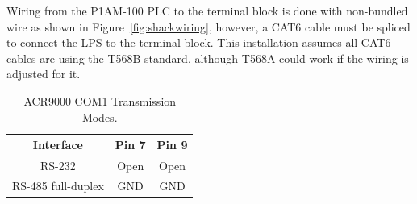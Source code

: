 \documentclass[titlepage]{article}
\begin{document}
Wiring from the P1AM-100 PLC to the terminal block is done with non-bundled wire as shown in Figure~\ref{fig:shackwiring}, however, a CAT6 cable must be spliced to connect the LPS to the terminal block. This installation assumes all CAT6 cables are using the T568B standard, although T568A could work if the wiring is adjusted for it.

\begin{table}
  \begin{center}
    \begin{tabular}{c|c|c}
      Interface          & Pin 7 & Pin 9 \\ \hline
      RS-232             & Open  & Open  \\
      RS-485 full-duplex & GND   & GND   \\
    \end{tabular}
  \end{center}
  \caption{ACR9000 COM1 Transmission Modes.}\label{tab:acr9000com1}
\end{table}
\end{document}

